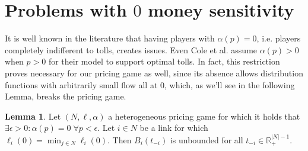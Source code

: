 \documentclass[10pt,a4paper]{book}
\newcommand{\R}{\mathbb{R}}
\theoremstyle{definition}
\newtheorem{lemma}[definition]{Lemma}
\theoremstyle{comment}
\begin{document}
\section{Problems with $0$ money sensitivity}

It is well known in the literature that having players with $\alpha(p) = 0$, i.e. players completely indifferent to tolls, creates issues.
Even Cole et al. \cite{10.1145/780542.780618} assume $\alpha(p) > 0$ when $p > 0$ for their model to support optimal tolls.
In fact, this restriction proves necessary for our pricing game as well, since its absence allows distribution functions with arbitrarily small flow all at $0$, which, as we'll see in the following Lemma, breaks the pricing game.

\begin{lemma}
	\label{lemma:a_0_0}
	Let $(N, \ell, \alpha)$ a heterogeneous pricing game for which it holds that $\exists \epsilon > 0: \alpha(p) = 0 \; \forall p < \epsilon$.
	Let $i \in N$ be a link for which $\ell_i(0) = \min_{j \in N} \ell_i(0)$.
	Then $B_i(t_{-i})$ is unbounded for all $t_{-i} \in \R_+^{|N| - 1}$.
\end{lemma}
\end{document}
